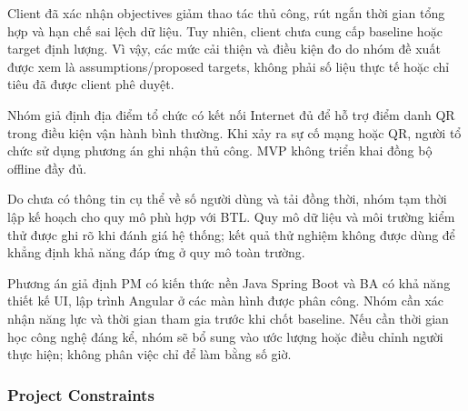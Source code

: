 Client đã xác nhận objectives giảm thao tác thủ công, rút ngắn thời gian tổng hợp và hạn chế sai lệch dữ liệu. Tuy nhiên, client chưa cung cấp baseline hoặc target định lượng. Vì vậy, các mức cải thiện và điều kiện đo do nhóm đề xuất được xem là assumptions/proposed targets, không phải số liệu thực tế hoặc chỉ tiêu đã được client phê duyệt.

Nhóm giả định địa điểm tổ chức có kết nối Internet đủ để hỗ trợ điểm danh QR trong điều kiện vận hành bình thường. Khi xảy ra sự cố mạng hoặc QR, người tổ chức sử dụng phương án ghi nhận thủ công. MVP không triển khai đồng bộ offline đầy đủ.

Do chưa có thông tin cụ thể về số người dùng và tải đồng thời, nhóm tạm thời lập kế hoạch cho quy mô phù hợp với BTL. Quy mô dữ liệu và môi trường kiểm thử được ghi rõ khi đánh giá hệ thống; kết quả thử nghiệm không được dùng để khẳng định khả năng đáp ứng ở quy mô toàn trường.

Phương án giả định PM có kiến thức nền Java Spring Boot và BA có khả năng thiết kế UI, lập trình Angular ở các màn hình được phân công. Nhóm cần xác nhận năng lực và thời gian tham gia trước khi chốt baseline. Nếu cần thời gian học công nghệ đáng kể, nhóm sẽ bổ sung vào ước lượng hoặc điều chỉnh người thực hiện; không phân việc chỉ để làm bằng số giờ.

\subsubsection{Project Constraints}


